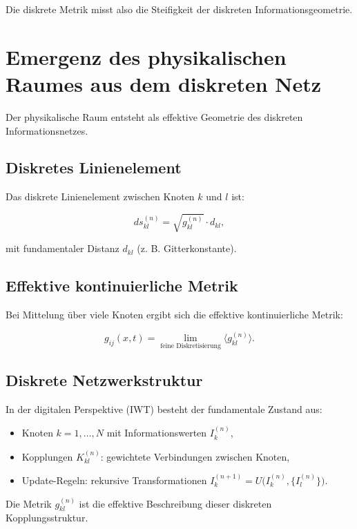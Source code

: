 Die diskrete Metrik misst also die Steifigkeit der diskreten Informationsgeometrie.

\section{Emergenz des physikalischen Raumes aus dem diskreten Netz}
\label{sec:raumemergenz}

Der physikalische Raum entsteht als effektive Geometrie des diskreten Informationsnetzes.

\subsection{Diskretes Linienelement}
\label{sub:linienelement}

Das diskrete Linienelement zwischen Knoten \( k \) und \( l \) ist:

\[
ds_{kl}^{(n)} = \sqrt{g_{kl}^{(n)}} \cdot d_{kl},
\]

mit fundamentaler Distanz \( d_{kl} \) (z. B. Gitterkonstante).

\subsection{Effektive kontinuierliche Metrik}
\label{sub:kontinuierliche_metrik}

Bei Mittelung über viele Knoten ergibt sich die effektive kontinuierliche Metrik:

\[
g_{ij}(x, t) = \lim_{\text{feine Diskretisierung}} \langle g_{kl}^{(n)} \rangle.
\]

\subsection{Diskrete Netzwerkstruktur}
\label{sub:netzwerkstruktur}

In der digitalen Perspektive (IWT) besteht der fundamentale Zustand aus:

\begin{itemize}
    \item Knoten \( k = 1, \dots, N \) mit Informationswerten \( I_k^{(n)} \),
    \item Kopplungen \( K_{kl}^{(n)} \): gewichtete Verbindungen zwischen Knoten,
    \item Update-Regeln: rekursive Transformationen \( I_k^{(n+1)} = U\bigl(I_k^{(n)}, \{I_l^{(n)}\}\bigr) \).
\end{itemize}

Die Metrik \( g_{kl}^{(n)} \) ist die effektive Beschreibung dieser diskreten Kopplungsstruktur.

